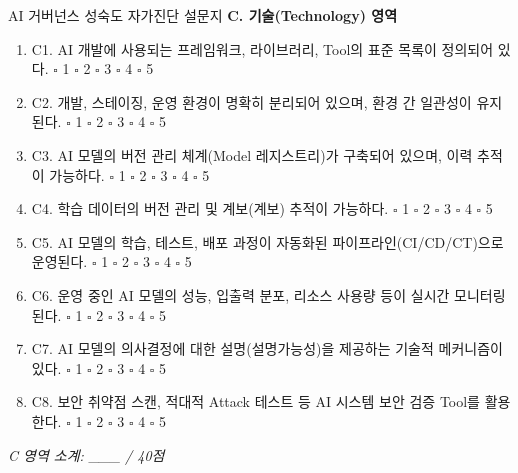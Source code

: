 \begin{practicaltool}{AI 거버넌스 성숙도 자가진단 설문지}
\textbf{C. 기술(Technology) 영역}
\begin{enumerate}
 \item C1. AI 개발에 사용되는 프레임워크, 라이브러리, Tool의 표준 목록이 정의되어 있다. \hfill $\square$ 1 $\square$ 2 $\square$ 3 $\square$ 4 $\square$ 5
 \item C2. 개발, 스테이징, 운영 환경이 명확히 분리되어 있으며, 환경 간 일관성이 유지된다. \hfill $\square$ 1 $\square$ 2 $\square$ 3 $\square$ 4 $\square$ 5
 \item C3. AI 모델의 버전 관리 체계(Model 레지스트리)가 구축되어 있으며, 이력 추적이 가능하다. \hfill $\square$ 1 $\square$ 2 $\square$ 3 $\square$ 4 $\square$ 5
 \item C4. 학습 데이터의 버전 관리 및 계보(계보) 추적이 가능하다. \hfill $\square$ 1 $\square$ 2 $\square$ 3 $\square$ 4 $\square$ 5
 \item C5. AI 모델의 학습, 테스트, 배포 과정이 자동화된 파이프라인(CI/CD/CT)으로 운영된다. \hfill $\square$ 1 $\square$ 2 $\square$ 3 $\square$ 4 $\square$ 5
 \item C6. 운영 중인 AI 모델의 성능, 입출력 분포, 리소스 사용량 등이 실시간 모니터링된다. \hfill $\square$ 1 $\square$ 2 $\square$ 3 $\square$ 4 $\square$ 5
 \item C7. AI 모델의 의사결정에 대한 설명(설명가능성)을 제공하는 기술적 메커니즘이 있다. \hfill $\square$ 1 $\square$ 2 $\square$ 3 $\square$ 4 $\square$ 5
 \item C8. 보안 취약점 스캔, 적대적 Attack 테스트 등 AI 시스템 보안 검증 Tool를 활용한다. \hfill $\square$ 1 $\square$ 2 $\square$ 3 $\square$ 4 $\square$ 5
\end{enumerate}
\textit{C 영역 소계: \_\_\_ / 40점}


\end{practicaltool}
